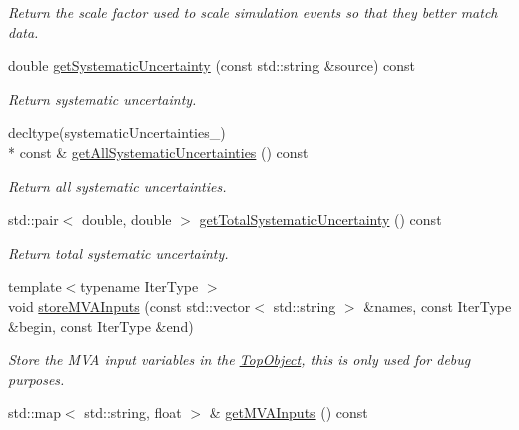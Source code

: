 \begin{DoxyCompactItemize}
\begin{DoxyCompactList}\small\item\em Return the scale factor used to scale simulation events so that they better match data. \end{DoxyCompactList}\item 
\hypertarget{classTopObject_add523f130ec310825913f90f2ad92cd1}{double \hyperlink{classTopObject_add523f130ec310825913f90f2ad92cd1}{get\-Systematic\-Uncertainty} (const std\-::string \&source) const }\label{classTopObject_add523f130ec310825913f90f2ad92cd1}

\begin{DoxyCompactList}\small\item\em Return systematic uncertainty. \end{DoxyCompactList}\item 
\hypertarget{classTopObject_a067f7af6a6c0be618cbec94324fecc1e}{decltype(systematic\-Uncertainties\-\_\-) \\*
const \& \hyperlink{classTopObject_a067f7af6a6c0be618cbec94324fecc1e}{get\-All\-Systematic\-Uncertainties} () const }\label{classTopObject_a067f7af6a6c0be618cbec94324fecc1e}

\begin{DoxyCompactList}\small\item\em Return all systematic uncertainties. \end{DoxyCompactList}\item 
\hypertarget{classTopObject_a1c0c5edafaa226f473002826f291c3ef}{std\-::pair$<$ double, double $>$ \hyperlink{classTopObject_a1c0c5edafaa226f473002826f291c3ef}{get\-Total\-Systematic\-Uncertainty} () const }\label{classTopObject_a1c0c5edafaa226f473002826f291c3ef}

\begin{DoxyCompactList}\small\item\em Return total systematic uncertainty. \end{DoxyCompactList}\item 
\hypertarget{classTopObject_aba6a5e510488a050a1ade69ba2d87960}{{\footnotesize template$<$typename Iter\-Type $>$ }\\void \hyperlink{classTopObject_aba6a5e510488a050a1ade69ba2d87960}{store\-M\-V\-A\-Inputs} (const std\-::vector$<$ std\-::string $>$ \&names, const Iter\-Type \&begin, const Iter\-Type \&end)}\label{classTopObject_aba6a5e510488a050a1ade69ba2d87960}

\begin{DoxyCompactList}\small\item\em Store the M\-V\-A input variables in the \hyperlink{classTopObject}{Top\-Object}, this is only used for debug purposes. \end{DoxyCompactList}\item 
\hypertarget{classTopObject_a7bedcf64865a2890c32e6699964d66f0}{std\-::map$<$ std\-::string, float $>$ \& \hyperlink{classTopObject_a7bedcf64865a2890c32e6699964d66f0}{get\-M\-V\-A\-Inputs} () const }\label{classTopObject_a7bedcf64865a2890c32e6699964d66f0}


\end{DoxyCompactItemize}

